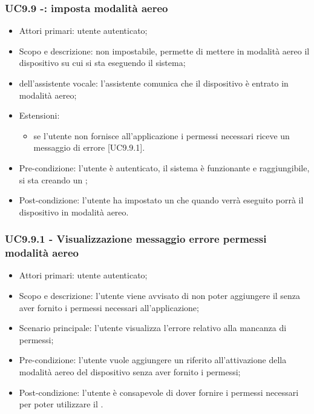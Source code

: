 \subsubsection{UC9.9 -: imposta modalità aereo}
\begin{itemize}
	\item  Attori primari: utente autenticato;
	\item  Scopo e descrizione:  non impostabile, permette di mettere in modalità aereo il dispositivo  su cui si sta eseguendo il sistema;
	\item  {} dell'assistente vocale: l'assistente comunica che il dispositivo è entrato in modalità aereo;
	\item  Estensioni: 
		   \begin{itemize}
				\item se l'utente non fornisce all'applicazione i permessi necessari riceve un messaggio di errore [UC9.9.1].
		   \end{itemize}
	\item  Pre-condizione: l'utente è autenticato, il sistema è funzionante e raggiungibile, si sta creando un ;
	\item  Post-condizione: l'utente ha impostato un  che quando verrà eseguito porrà il dispositivo  in modalità aereo.
\end{itemize}
\subsubsection{UC9.9.1 - Visualizzazione messaggio errore permessi modalità aereo}
\begin{itemize}
	\item  Attori primari: utente autenticato;
	\item  Scopo e descrizione: l'utente viene avvisato di non poter aggiungere il  senza aver fornito i permessi necessari all'applicazione;
	\item  Scenario principale: l'utente visualizza l'errore relativo alla mancanza di permessi;
	\item  Pre-condizione: l'utente vuole aggiungere un  riferito all'attivazione della modalità aereo del dispositivo  senza aver fornito i permessi;
	\item  Post-condizione: l'utente è consapevole di dover fornire i permessi necessari per poter utilizzare il .
\end{itemize}

